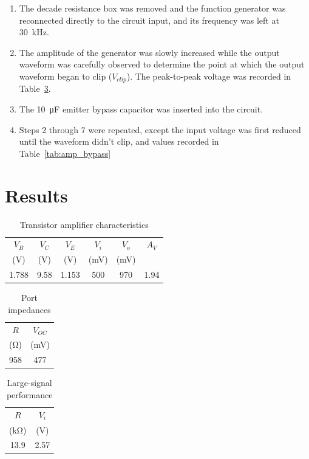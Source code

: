 \begin{enumerate}
\item The decade resistance box was removed and the function generator was reconnected directly to the circuit input, and its frequency was left at \SI{30}{\kilo\hertz}.
\item The amplitude of the generator was slowly increased while the output waveform was carefully observed to determine the point at which the output waveform began to clip ($V_{clip}$). The peak-to-peak voltage was recorded in Table~\ref{tab:lrg_sig}.
\item The \SI{10}{\micro\farad} emitter bypass capacitor was inserted into the circuit.
\item Steps 2 through 7 were repeated, except the input voltage was first reduced until the waveform didn’t clip, and values recorded in Table~\ref{tab:amp_bypass}
\end{enumerate}

\section{Results}

\begin{table}[hbtp]
  \centering
  \begin{tabular}{ccc|cc|c}
    $V_B$    & $V_C$    & $V_E$    & $V_i$     & $V_o$     & $A_V$ \\
    (\si{V}) & (\si{V}) & (\si{V}) & (\si{mV}) & (\si{mV}) &       \\
    \hline
    1.788    & 9.58     & 1.153    & 500       & 970       & 1.94  \\
  \end{tabular}
  \caption{\label{tab:amp} Transistor amplifier characteristics}
\end{table}

\begin{table}[hbtp]
  \centering
  \begin{tabular}{cc}
    $R$         & $V_{OC}$  \\
    (\si{\ohm}) & (\si{mV}) \\
    \hline
    958         & 477       \\
  \end{tabular}
  \caption{\label{tab:imp} Port impedances}
\end{table}

\begin{table}[hbtp]
  \centering
  \begin{tabular}{cc}
    $R$              & $V_i$    \\
    (\si{\kilo\ohm}) & (\si{V}) \\
    \hline
    13.9             & 2.57     \\
  \end{tabular}
  \caption{\label{tab:lrg_sig} Large-signal performance}
\end{table}

